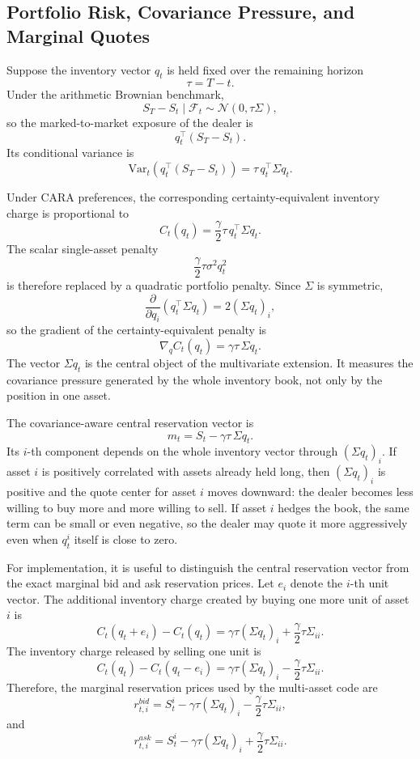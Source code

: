 \subsection{Portfolio Risk, Covariance Pressure, and Marginal Quotes}

Suppose the inventory vector $q_t$ is held fixed over the remaining horizon
\[
\tau=T-t.
\]
Under the arithmetic Brownian benchmark,
\[
S_T-S_t\mid\mathcal{F}_t
\sim
\mathcal{N}(0,\tau\Sigma),
\]
so the marked-to-market exposure of the dealer is
\[
q_t^\top(S_T-S_t).
\]
Its conditional variance is
\[
\mathrm{Var}_t\!\left(q_t^\top(S_T-S_t)\right)
=
\tau\,q_t^\top\Sigma q_t.
\]

Under CARA preferences, the corresponding certainty-equivalent inventory charge is proportional to
\[
C_t(q_t)
=
\frac{\gamma}{2}\tau\,q_t^\top\Sigma q_t.
\]
The scalar single-asset penalty
\[
\frac{\gamma}{2}\tau\sigma^2q_t^2
\]
is therefore replaced by a quadratic portfolio penalty. Since $\Sigma$ is symmetric,
\[
\frac{\partial}{\partial q_i}\left(q_t^\top\Sigma q_t\right)
=
2(\Sigma q_t)_i,
\]
so the gradient of the certainty-equivalent penalty is
\[
\nabla_q C_t(q_t)
=
\gamma\tau\,\Sigma q_t.
\]
The vector $\Sigma q_t$ is the central object of the multivariate extension. It measures the covariance pressure generated by the whole inventory book, not only by the position in one asset.

The covariance-aware central reservation vector is
\[
m_t
=
S_t-\gamma\tau\,\Sigma q_t.
\]
Its $i$-th component depends on the whole inventory vector through $(\Sigma q_t)_i$. If asset $i$ is positively correlated with assets already held long, then $(\Sigma q_t)_i$ is positive and the quote center for asset $i$ moves downward: the dealer becomes less willing to buy more and more willing to sell. If asset $i$ hedges the book, the same term can be small or even negative, so the dealer may quote it more aggressively even when $q_t^i$ itself is close to zero.

For implementation, it is useful to distinguish the central reservation vector from the exact marginal bid and ask reservation prices. Let $e_i$ denote the $i$-th unit vector. The additional inventory charge created by buying one more unit of asset $i$ is
\[
C_t(q_t+e_i)-C_t(q_t)
=
\gamma\tau(\Sigma q_t)_i
+
\frac{\gamma}{2}\tau\Sigma_{ii}.
\]
The inventory charge released by selling one unit is
\[
C_t(q_t)-C_t(q_t-e_i)
=
\gamma\tau(\Sigma q_t)_i
-
\frac{\gamma}{2}\tau\Sigma_{ii}.
\]
Therefore, the marginal reservation prices used by the multi-asset code are
\[
r_{t,i}^{bid}
=
S_t^i-\gamma\tau(\Sigma q_t)_i
-
\frac{\gamma}{2}\tau\Sigma_{ii},
\]
and
\[
r_{t,i}^{ask}
=
S_t^i-\gamma\tau(\Sigma q_t)_i
+
\frac{\gamma}{2}\tau\Sigma_{ii}.
\]

